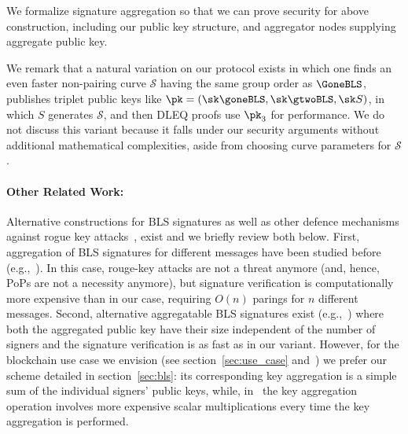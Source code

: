 We formalize signature aggregation so that we can prove security for above
construction, including our public key structure, and aggregator nodes
supplying aggregate public key. 

We remark that a natural variation on our protocol exists in which
one finds an even faster non-pairing curve $\mathcal{S}$ having the same
group order as $\GoneBLS$,  publishes triplet public keys like
$\pk = (\sk \goneBLS, \sk \gtwoBLS, \sk S)$, in which $S$ generates
$\mathcal{S}$, and then DLEQ proofs use $\pk_3$ for performance.
We do not discuss this variant because it falls under our security
arguments without additional mathematical complexities,
 aside from choosing curve parameters for $\mathcal{S}$.
 
 
\paragraph{Other Related Work:} Alternative constructions for BLS signatures as well as other defence mechanisms against 
rogue key attacks~\cite{proofs_of_posession}, exist and we briefly review both below. First, aggregation of BLS signatures for different messages have been studied before
(e.g.,~\cite{aggregate_BLS_signatures}). In this case, rouge-key attacks are not a threat anymore (and, hence, PoPs are not a necessity anymore), 
but signature verification is computationally more expensive than in our case, requiring $O(n)$ parings for $n$ different messages. Second, alternative aggregatable 
BLS signatures exist (e.g.,~\cite{boneh_compact_multisig}) where both the aggregated public key have their size independent 
of the number of signers and the signature verification is as fast as in our variant. However, for the blockchain use case we envision 
(see section~\ref{sec:use_case} and~\cite{ourLC}) we prefer our scheme detailed in section~\ref{sec:bls}: its corresponding key aggregation is a simple sum 
of the individual signers' public keys, while, in~\cite{boneh_compact_multisig} the key aggregation operation involves more expensive scalar 
multiplications every time the key aggregation is performed.
